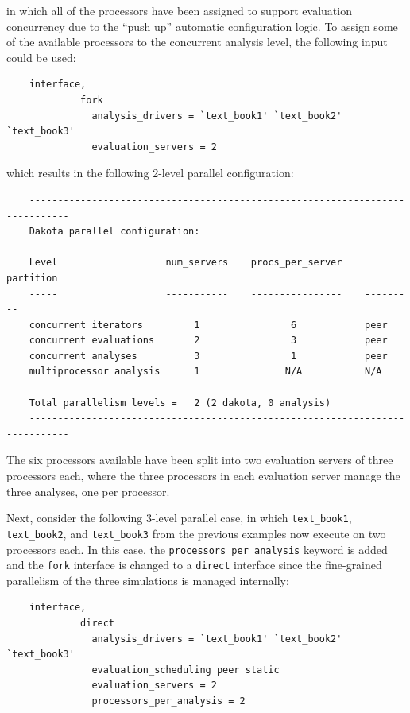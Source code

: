 in which all of the processors have been assigned to support
evaluation concurrency due to the ``push up'' automatic configuration
logic.  To assign some of the available processors to the concurrent 
analysis level, the following input could be used:
\begin{small}
\begin{verbatim}
    interface,
             fork
               analysis_drivers = `text_book1' `text_book2' `text_book3'
               evaluation_servers = 2
\end{verbatim}
\end{small}

which results in the following 2-level parallel configuration:
\begin{small}
\begin{verbatim}
    -----------------------------------------------------------------------------
    Dakota parallel configuration:

    Level                   num_servers    procs_per_server    partition
    -----                   -----------    ----------------    ---------
    concurrent iterators         1                6            peer
    concurrent evaluations       2                3            peer
    concurrent analyses          3                1            peer
    multiprocessor analysis      1               N/A           N/A

    Total parallelism levels =   2 (2 dakota, 0 analysis)
    -----------------------------------------------------------------------------
\end{verbatim}
\end{small}

The six processors available have been split into two evaluation
servers of three processors each, where the three processors in each
evaluation server manage the three analyses, one per processor.

Next, consider the following 3-level parallel case, in which
\texttt{text\_book1}, \texttt{text\_book2}, and \texttt{text\_book3}
from the previous examples now execute on two processors each. In this
case, the \texttt{processors\_per\_analysis} keyword is added and the
\texttt{fork} interface is changed to a \texttt{direct} interface
since the fine-grained parallelism of the three simulations is managed
internally:
\begin{small}
\begin{verbatim}
    interface,
             direct
               analysis_drivers = `text_book1' `text_book2' `text_book3'
               evaluation_scheduling peer static
               evaluation_servers = 2
               processors_per_analysis = 2
\end{verbatim}
\end{small}

